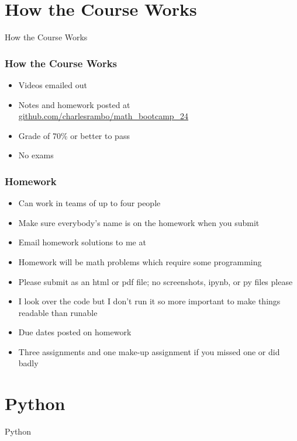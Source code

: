 \documentclass{beamer}
\begin{document}
\section{How the Course Works}

\begin{frame}
\begin{center}
\Huge How the Course Works
\end{center}
\end{frame}

\begin{frame}
\frametitle{How the Course Works}
\begin{itemize}
\item Videos emailed out
\item Notes and homework posted at \url{github.com/charlesrambo/math_bootcamp_24}
\item Grade of 70\% or better to pass
\item No exams
\end{itemize}
\end{frame}

\begin{frame}
\frametitle{Homework}
\small
\begin{itemize}
\item Can work in teams of up to four people
\item Make sure everybody's name is on the homework when you submit
\item Email homework solutions to me at 
\item Homework will be math problems which require some programming
\item Please submit as an html or pdf file; no screenshots, ipynb, or py files please
\item I look over the code but I don't run it so more important to make things readable than runable
\item Due dates posted on homework
\item Three assignments and one make-up assignment if you missed one or did badly
\end{itemize}
\end{frame}




\section{Python}

\begin{frame}
\begin{center}
\Huge Python
\end{center}
\end{frame}
\end{document}

